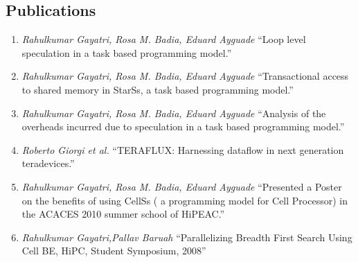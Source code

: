\documentclass[margin]{res}
\begin{document}
\begin{resume}
\section{Publications}
%
\begin{enumerate}
	   \item \textit{Rahulkumar Gayatri, Rosa M. Badia, Eduard Ayguade}
			 \enquote{Loop level speculation in a task based programming model.} \\
%
	   \item \textit{Rahulkumar Gayatri, Rosa M. Badia, Eduard Ayguade}
			 \enquote{Transactional access to shared memory in StarSs, a task based programming model.} \\
%
	   \item \textit{Rahulkumar Gayatri, Rosa M. Badia, Eduard Ayguade}
			 \enquote{Analysis of the overheads incurred due to speculation in a task based programming model.} \\
%
	   \item \textit{Roberto Giorgi et al.}
			 \enquote{TERAFLUX: Harnessing dataflow in next generation teradevices.} \\
%
	   \item \textit{Rahulkumar Gayatri, Rosa M. Badia, Eduard Ayguade}
			 \enquote{Presented a Poster on the benefits of using CellSs ( a programming model for Cell Processor) in the ACACES 2010 summer school of HiPEAC.}
%
	   \item \textit{Rahulkumar Gayatri,Pallav Baruah} \enquote{Parallelizing Breadth First Search Using Cell BE, HiPC, Student Symposium, 2008}
%
\end {enumerate}
%

\end{resume}
\end{document}
